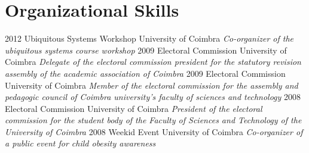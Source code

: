 \documentclass[]{friggeri-cv} %
\begin{document}
\section{Organizational Skills}

\begin{entrylist}
\entry
{2012}
{Ubiquitous Systems Workshop}
{University of Coimbra}
{\emph{Co-organizer of the ubiquitous systems course workshop}}
\entry
{2009}
{Electoral Commission}
{University of Coimbra}
{\emph{Delegate of the electoral commission president for the statutory revision assembly of the academic association of Coimbra}}
\entry
{2009}
{Electoral Commission}
{University of Coimbra}
{\emph{Member of the electoral commission for the assembly and pedagogic council of Coimbra university's faculty of sciences and technology}}
\entry
{2008}
{Electoral Commission}
{University of Coimbra}
{\emph{President of the electoral commission for the student body of the Faculty of Sciences and Technology of the University of Coimbra}}
\entry
{2008}
{Weekid Event}
{University of Coimbra}
{\emph{Co-organizer of a public event for child obesity awareness}}
\end{entrylist}
\end{document}
